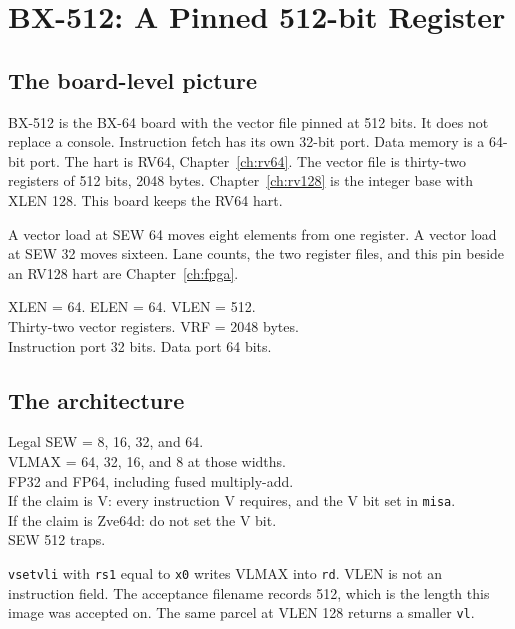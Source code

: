 \chapter{BX-512: A Pinned 512-bit Register}
\label{ch:bx512}

\section{The board-level picture}

BX-512 is the BX-64 board with the vector file pinned at 512 bits. It does not replace a console. Instruction fetch has its own 32-bit port. Data memory is a 64-bit port. The hart is RV64, Chapter~\ref{ch:rv64}. The vector file is thirty-two registers of 512 bits, 2048 bytes. Chapter~\ref{ch:rv128} is the integer base with XLEN 128. This board keeps the RV64 hart.

A vector load at SEW 64 moves eight elements from one register. A vector load at SEW 32 moves sixteen. Lane counts, the two register files, and this pin beside an RV128 hart are Chapter~\ref{ch:fpga}.

\begin{spec}
XLEN = 64. ELEN = 64. VLEN = 512.\\
Thirty-two vector registers. VRF = 2048 bytes.\\
Instruction port 32 bits. Data port 64 bits.
\end{spec}

\section{The architecture}

\begin{spec}
Legal SEW = 8, 16, 32, and 64.\\
VLMAX = 64, 32, 16, and 8 at those widths.\\
FP32 and FP64, including fused multiply-add.\\
If the claim is V: every instruction V requires, and the V bit set in \texttt{misa}.\\
If the claim is Zve64d: do not set the V bit.\\
SEW 512 traps.
\end{spec}

\texttt{vsetvli} with \texttt{rs1} equal to \texttt{x0} writes VLMAX into \texttt{rd}. VLEN is not an instruction field. The acceptance filename records 512, which is the length this image was accepted on. The same parcel at VLEN 128 returns a smaller \texttt{vl}.


